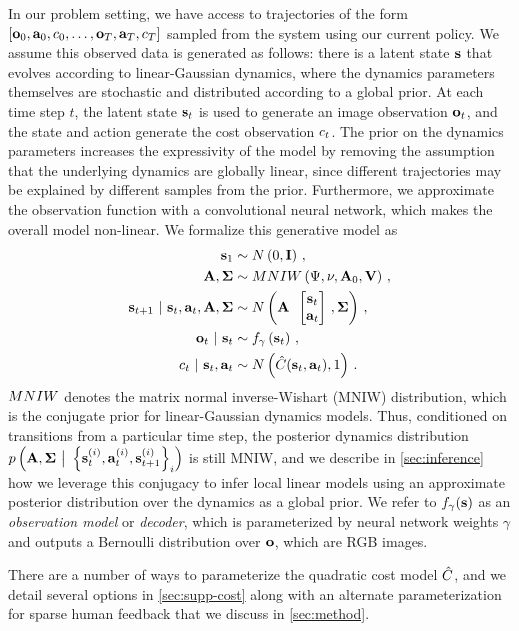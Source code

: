 In our problem setting, we have access to trajectories of the form $\left[\mathbf{o}_0,\mathbf{a}_0,c_0,\ldots,\mathbf{o}_{T},\mathbf{a}_{T},c_{T}\right]$ sampled from the system using our current policy. We assume this observed data is generated as follows: there is a latent state $\mathbf{s}$ that evolves according to linear-Gaussian dynamics, where the dynamics parameters themselves are stochastic and distributed according to a global prior. At each time step $t$, the latent state $\mathbf{s}_t$ is used to generate an image observation $\mathbf{o}_t$, and the state and action generate the cost observation $c_t$. The prior on the dynamics parameters increases the expressivity of the model by removing the assumption that the underlying dynamics are globally linear, since different trajectories may be explained by different samples from the prior. Furthermore, we approximate the observation function with a convolutional neural network, which makes the overall model non-linear. We formalize this generative model as
\begin{align}
    \state_1&\sim\N\left(0,\mathbf{I}\right)\,,\label{eq:gm-start}\\
    \dynmat,\dyncovar&\sim\MNIW\left(\Psi,\nu,\dynmat_0,\mathbf{V}\right)\,,\label{eq:dyn}\\
    \state_{t+1}~|~\state_t,\action_t,\dynmat,\dyncovar&\sim\N\left(\dynmat\colvec{\state_t\\\action_t},\dyncovar\right)\,,\label{eq:dyn2}\\
    \observation_t~|~\state_t&\sim\decoder_\gamma\left(\state_t\right)\,,\\
    \costsample_t~|~\state_t,\action_t&\sim\N\left(\costmodel(\state_t,\action_t),1\right)\,.\label{eq:gm-end}
\end{align}
$MNIW$ denotes the matrix normal inverse-Wishart (MNIW) distribution, which is the conjugate prior for linear-Gaussian dynamics models. Thus, conditioned on transitions from a particular time step, the posterior dynamics distribution $p\left(\mathbf{A},\bm{\Sigma}~\big|~\left\{\mathbf{s}^{(i)}_t,\mathbf{a}^{(i)}_t,\mathbf{s}^{(i)}_{t+1}\right\}_i\right)$ is still MNIW, and we describe in \autoref{sec:inference} how we leverage this conjugacy to infer local linear models using an approximate posterior distribution over the dynamics as a global prior. We refer to $f_\gamma(\mathbf{s})$ as an \emph{observation model} or \emph{decoder}, which is parameterized by neural network weights $\gamma$ and outputs a Bernoulli distribution over $\mathbf{o}$, which are RGB images.

There are a number of ways to parameterize the quadratic cost model $\hat{C}$, and we detail several options in \autoref{sec:supp-cost} along with an alternate parameterization for sparse human feedback that we discuss in \autoref{sec:method}.

